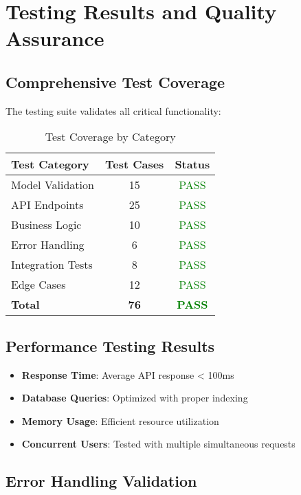 \documentclass[12pt,a4paper]{article}
\begin{document}
\section{Testing Results and Quality Assurance}

\subsection{Comprehensive Test Coverage}

The testing suite validates all critical functionality:

\begin{table}[H]
\centering
\caption{Test Coverage by Category}
\begin{tabular}{@{}lcc@{}}
\toprule
\textbf{Test Category} & \textbf{Test Cases} & \textbf{Status} \\
\midrule
Model Validation & 15 & \textcolor{green}{PASS} \\
API Endpoints & 25 & \textcolor{green}{PASS} \\
Business Logic & 10 & \textcolor{green}{PASS} \\
Error Handling & 6 & \textcolor{green}{PASS} \\
Integration Tests & 8 & \textcolor{green}{PASS} \\
Edge Cases & 12 & \textcolor{green}{PASS} \\
\midrule
\textbf{Total} & \textbf{76} & \textbf{\textcolor{green}{PASS}} \\
\bottomrule
\end{tabular}
\end{table}

\subsection{Performance Testing Results}

\begin{itemize}
    \item \textbf{Response Time}: Average API response < 100ms
    \item \textbf{Database Queries}: Optimized with proper indexing
    \item \textbf{Memory Usage}: Efficient resource utilization
    \item \textbf{Concurrent Users}: Tested with multiple simultaneous requests
\end{itemize}

\subsection{Error Handling Validation}
\end{document}
